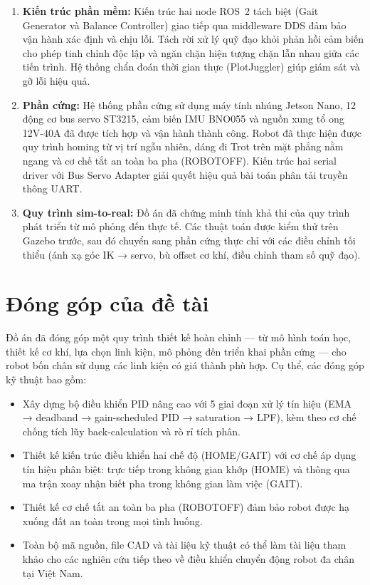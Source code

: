 \begin{enumerate}
    \item \textbf{Kiến trúc phần mềm:} Kiến trúc hai node ROS~2 tách biệt (Gait Generator và Balance Controller) giao tiếp qua middleware DDS đảm bảo vận hành xác định và chịu lỗi. Tách rời xử lý quỹ đạo khỏi phản hồi cảm biến cho phép tinh chỉnh độc lập và ngăn chặn hiện tượng chặn lẫn nhau giữa các tiến trình. Hệ thống chẩn đoán thời gian thực (PlotJuggler) giúp giám sát và gỡ lỗi hiệu quả.

    \item \textbf{Phần cứng:} Hệ thống phần cứng sử dụng máy tính nhúng Jetson Nano, 12 động cơ bus servo ST3215, cảm biến IMU BNO055 và nguồn xung tổ ong 12V-40A đã được tích hợp và vận hành thành công. Robot đã thực hiện được quy trình homing từ vị trí ngẫu nhiên, dáng đi Trot trên mặt phẳng nằm ngang và cơ chế tắt an toàn ba pha (ROBOTOFF). Kiến trúc hai serial driver với Bus Servo Adapter giải quyết hiệu quả bài toán phân tải truyền thông UART.

    \item \textbf{Quy trình sim-to-real:} Đồ án đã chứng minh tính khả thi của quy trình phát triển từ mô phỏng đến thực tế. Các thuật toán được kiểm thử trên Gazebo trước, sau đó chuyển sang phần cứng thực chỉ với các điều chỉnh tối thiểu (ánh xạ góc IK → servo, bù offset cơ khí, điều chỉnh tham số quỹ đạo).
\end{enumerate}

\section{Đóng góp của đề tài}

Đồ án đã đóng góp một quy trình thiết kế hoàn chỉnh --- từ mô hình toán học, thiết kế cơ khí, lựa chọn linh kiện, mô phỏng đến triển khai phần cứng --- cho robot bốn chân sử dụng các linh kiện có giá thành phù hợp. Cụ thể, các đóng góp kỹ thuật bao gồm:

\begin{itemize}
    \item Xây dựng bộ điều khiển PID nâng cao với 5 giai đoạn xử lý tín hiệu (EMA → deadband → gain-scheduled PID → saturation → LPF), kèm theo cơ chế chống tích lũy back-calculation và rò rỉ tích phân.
    \item Thiết kế kiến trúc điều khiển hai chế độ (HOME/GAIT) với cơ chế áp dụng tín hiệu phân biệt: trực tiếp trong không gian khớp (HOME) và thông qua ma trận xoay nhận biết pha trong không gian làm việc (GAIT).
    \item Thiết kế cơ chế tắt an toàn ba pha (ROBOTOFF) đảm bảo robot được hạ xuống đất an toàn trong mọi tình huống.
    \item Toàn bộ mã nguồn, file CAD và tài liệu kỹ thuật có thể làm tài liệu tham khảo cho các nghiên cứu tiếp theo về điều khiển chuyển động robot đa chân tại Việt Nam.
\end{itemize}

